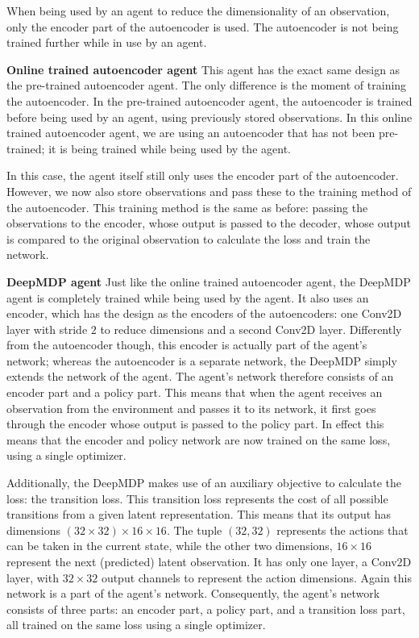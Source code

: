 When being used by an agent to reduce the dimensionality of an observation, only the encoder part of the autoencoder is used. The autoencoder is not being trained further while in use by an agent. \newline
 
\noindent \textbf{Online trained autoencoder agent}\newline
\noindent  This agent has the exact same design as the pre-trained autoencoder agent. The only difference is the moment of training the autoencoder. In the pre-trained autoencoder agent, the autoencoder is trained before being used by an agent, using previously stored observations. In this online trained autoencoder agent, we are using an autoencoder that has not been pre-trained; it is being trained while being used by the agent. 

In this case, the agent itself still only uses the encoder part of the autoencoder. However, we now also store observations and pass these to the training method of the autoencoder. This training method is the same as before: passing the observations to the encoder, whose output is passed to the decoder, whose output is compared to the original observation to calculate the loss and train the network.

\noindent \textbf{DeepMDP agent}\newline
\noindent Just like the online trained autoencoder agent, the DeepMDP agent is completely trained while being used by the agent. It also uses an encoder, which has the design as the encoders of the autoencoders: one Conv2D layer with stride $2$ to reduce dimensions and a second Conv2D layer. Differently from the autoencoder though, this encoder is actually part of the agent's network; whereas the autoencoder is a separate network, the DeepMDP simply extends the network of the agent. The agent's network therefore consists of an encoder part and a policy part. This means that when the agent receives an observation from the environment and passes it to its network, it first goes through the encoder whose output is passed to the policy part. In effect this means that the encoder and policy network are now trained on the same loss, using a single optimizer.

Additionally, the DeepMDP makes use of an auxiliary objective to calculate the loss: the transition loss. This transition loss represents the cost of all possible transitions from a given latent representation. This means that its output has dimensions $(32 \times 32) \times 16 \times 16$. The tuple $(32, 32)$ represents the actions that can be taken in the current state, while the other two dimensions, $16 \times 16$ represent the next (predicted) latent observation. It has only one layer, a Conv2D layer, with $32 \times 32$ output channels to represent the action dimensions. Again this network is a part of the agent's network. Consequently, the agent's network consists of three parts: an encoder part, a policy part, and a transition loss part, all trained on the same loss using a single optimizer.

